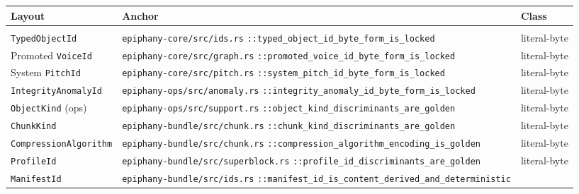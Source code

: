 \documentclass[11pt,letterpaper]{report}
\newcommand{\ub}{\_\allowbreak}
\begin{document}
\begingroup\footnotesize
\begin{longtable}{>{\raggedright\arraybackslash}p{1.5in} >{\raggedright\arraybackslash}p{3.0in} p{1.0in}}
  \toprule
  \textbf{Layout} & \textbf{Anchor} & \textbf{Class} \\
  \midrule
  \endhead
  \multicolumn{3}{l}{\emph{Imported from \texttt{app:bytes}:}} \\
  \addlinespace[2pt]
  \texttt{TypedObjectId} &
    \texttt{epiphany-core/src/ids.rs}\newline
    \texttt{::typed\ub object\ub id\ub byte\ub form\ub is\ub locked} &
    literal-byte \\
  Promoted \texttt{VoiceId} &
    \texttt{epiphany-core/src/graph.rs}\newline
    \texttt{::promoted\ub voice\ub id\ub byte\ub form\ub is\ub locked} &
    literal-byte \\
  System \texttt{PitchId} &
    \texttt{epiphany-core/src/pitch.rs}\newline
    \texttt{::system\ub pitch\ub id\ub byte\ub form\ub is\ub locked} &
    literal-byte \\
  \texttt{IntegrityAnomalyId} &
    \texttt{epiphany-ops/src/anomaly.rs}\newline
    \texttt{::integrity\ub anomaly\ub id\ub byte\ub form\ub is\ub locked} &
    literal-byte \\
  \texttt{ObjectKind} (ops) &
    \texttt{epiphany-ops/src/support.rs}\newline
    \texttt{::object\ub kind\ub discriminants\ub are\ub golden} &
    literal-byte \\
  \texttt{ChunkKind} &
    \texttt{epiphany-bundle/src/chunk.rs}\newline
    \texttt{::chunk\ub kind\ub discriminants\ub are\ub golden} &
    literal-byte \\
  \texttt{Compression\allowbreak Algorithm} &
    \texttt{epiphany-bundle/src/chunk.rs}\newline
    \texttt{::compression\ub algorithm\ub encoding\ub is\ub golden} &
    literal-byte \\
  \texttt{ProfileId} &
    \texttt{epiphany-bundle/src/superblock.rs}\newline
    \texttt{::profile\ub id\ub discriminants\ub are\ub golden} &
    literal-byte \\
  \texttt{ManifestId} &
    \texttt{epiphany-bundle/src/ids.rs}\newline
    \texttt{::manifest\ub id\ub is\ub content\ub derived\ub and\ub deterministic} &

\end{longtable}
\end{document}
